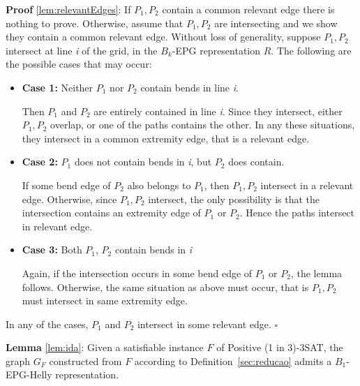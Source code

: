\documentclass[9pt]{entcs}
\begin{document}
\begin{prove*}
\textbf{Proof} \ref{lem:relevantEdges}: If $P_1, P_2$ contain a common relevant edge there is nothing to prove. Otherwise, assume that $P_1, P_2$ are intersecting and we show they contain a common relevant edge. Without loss of generality, suppose $P_1, P_2$ intersect at line \textit{i} of the grid, in the  $B_k$-EPG representation $R$. The following are the possible cases that may occur:

\begin{itemize}
\item \textbf{Case 1:} Neither $P_1$ nor $P_2$ contain bends in line \textit{i}. 

Then $P_1$ and $ P_2$  are entirely contained in line \textit{i}. Since they intersect, either $P_1, P_2$  overlap, or one of the paths contains the other. In any these situations, they intersect in a common extremity edge, that is a relevant edge.

\item \textbf{Case 2:} $P_1$ does not contain bends in \textit{i}, but $ P_2$ does contain.

If some bend edge of $P_2$ also belongs to $P_1$, then $P_1, P_2$  intersect in  a relevant edge. Otherwise, since $P_1, P_2$  intersect, the only possibility is that the intersection contains an extremity edge of $P_1$ or $ P_2$. Hence the paths intersect in relevant edge.  

\item \textbf{Case 3:} Both $P_1$,  $P_2$ contain bends in \textit{i}

Again, if the intersection occurs in some bend edge of $P_1$  or $P_2$, the lemma follows. Otherwise, the same situation as above must occur, that is $P_1, P_2$  must intersect in same extremity edge.
 
\end{itemize}
In any of the cases, $P_1$ and $P_2$ intersect in some relevant edge.
$\square$ \end{prove*}


\begin{lema*}\textbf{Lemma} \ref{lem:ida}:
Given a satisfiable instance $F$ of {\sc Positive (1 in 3)-3SAT}, the graph $G_F$ constructed from $F$ according to Definition~\ref{sec:reducao} admits a $B_{1}$-EPG-Helly representation.
\end{lema*}
\end{document}
